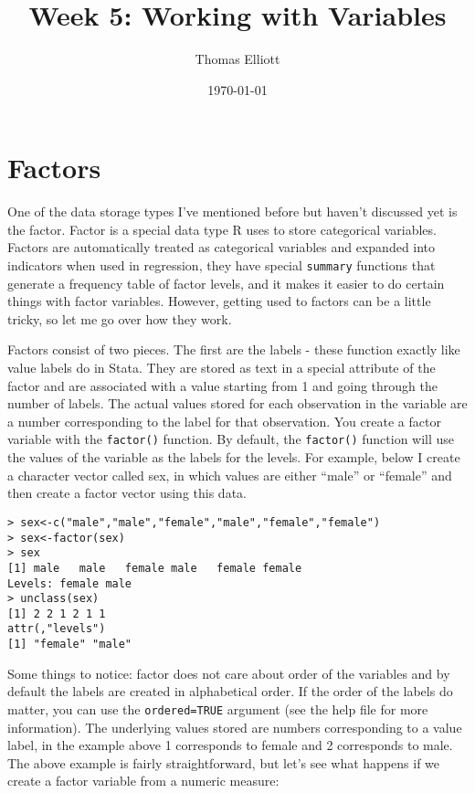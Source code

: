 \documentclass[12pt, oneside]{amsart}   	%
\title{Week 5: Working with Variables}
\author{Thomas Elliott}
\date{\today}							%
\begin{document}
\maketitle
\lstset{language=R}

\section{Factors}

One of the data storage types I've mentioned before but haven't discussed yet is the factor. Factor is a special data type R uses to store categorical variables. Factors are automatically treated as categorical variables and expanded into indicators when used in regression, they have special \texttt{summary} functions that generate a frequency table of factor levels, and it makes it easier to do certain things with factor variables. However, getting used to factors can be a little tricky, so let me go over how they work.

Factors consist of two pieces. The first are the labels - these function exactly like value labels do in Stata. They are stored as text in a special attribute of the factor and are associated with a value starting from 1 and going through the number of labels. The actual values stored for each observation in the variable are a number corresponding to the label for that observation. You create a factor variable with the \texttt{factor()} function. By default, the \texttt{factor()} function will use the values of the variable as the labels for the levels. For example, below I create a character vector called sex, in which values are either ``male'' or ``female'' and then create a factor vector using this data.

\begin{verbatim}
> sex<-c("male","male","female","male","female","female")
> sex<-factor(sex)
> sex
[1] male   male   female male   female female
Levels: female male
> unclass(sex)
[1] 2 2 1 2 1 1
attr(,"levels")
[1] "female" "male"  
\end{verbatim}

Some things to notice: factor does not care about order of the variables and by default the labels are created in alphabetical order. If the order of the labels do matter, you can use the \texttt{ordered=TRUE} argument (see the help file for more information). The underlying values stored are numbers corresponding to a value label, in the example above 1 corresponds to female and 2 corresponds to male. The above example is fairly straightforward, but let's see what happens if we create a factor variable from a numeric measure:
\end{document}
